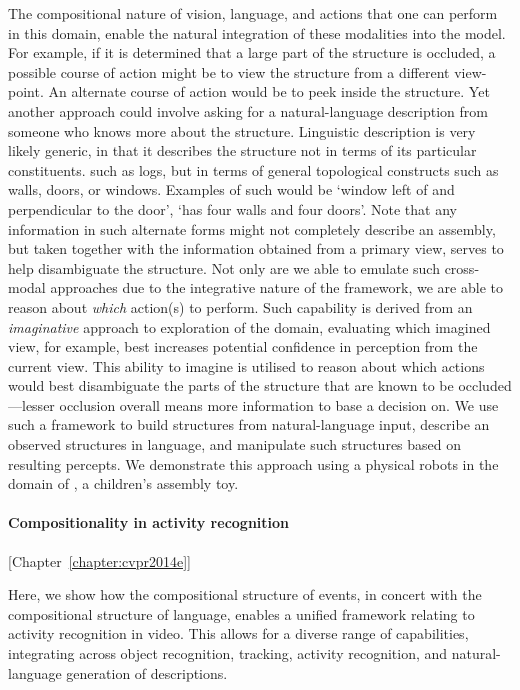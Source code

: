 The compositional nature of vision, language, and actions that one can
perform in this domain, enable the natural integration of these modalities
into the model.
%
For example, if it is determined that a large part of the structure is
occluded, a possible course of action might be to view the structure from a
different view-point.
%
An alternate course of action would be to peek inside the structure.
%
Yet another approach could involve asking for a natural-language description
from someone who knows more about the structure.
%
Linguistic description is very likely generic, in that it describes the
structure not in terms of its particular constituents. such as logs, but in
terms of general topological constructs such as walls, doors, or windows.
%
Examples of such would be `window left of and perpendicular to the door',
`has four walls and four doors'.
%
Note that any information in such alternate forms might not completely
describe an assembly, but taken together with the information obtained from a
primary view, serves to help disambiguate the structure.
%
Not only are we able to emulate such cross-modal approaches due to the
integrative nature of the framework, we are able to reason about \emph{which}
action(s) to perform.
%
Such capability is derived from an \emph{imaginative} approach to exploration
of the domain, evaluating which imagined view, for example, best increases
potential confidence in perception from the current view.
%
This ability to imagine is utilised to reason about which actions would best
disambiguate the parts of the structure that are known to be occluded---lesser
occlusion overall means more information to base a decision on.
%
We use such a framework to build structures from natural-language input,
describe an observed structures in language, and manipulate such structures
based on resulting percepts. We demonstrate this approach using a physical
robots in the domain of \LincolnLogs, a children's assembly toy.

\paragraph{Compositionality in activity recognition} [Chapter~\ref{chapter:cvpr2014e}]

Here, we show how the compositional structure of events, in concert with the
compositional structure of language, enables a unified framework relating to
activity recognition in video.
%
This allows for a diverse range of capabilities, integrating across object
recognition, tracking, activity recognition, and natural-language generation
of descriptions.

